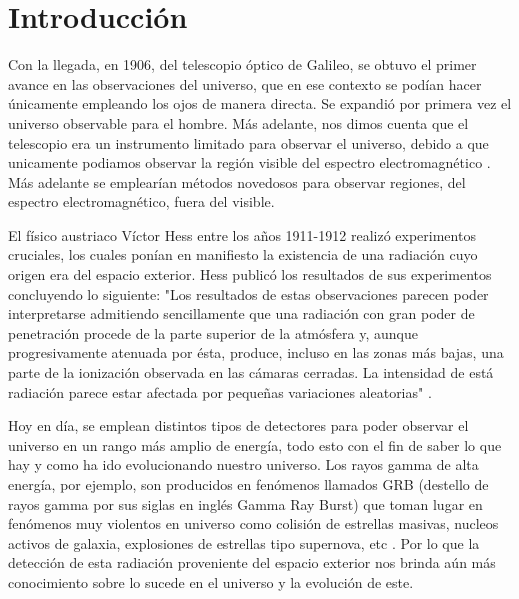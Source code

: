 \chapter{Introducción}
Con la llegada, en 1906, del telescopio óptico de Galileo, se obtuvo el primer avance en las observaciones del universo, que en ese contexto se podían hacer únicamente empleando los ojos de manera directa. Se expandió por primera vez el universo observable para el hombre. Más adelante, nos dimos cuenta que el telescopio era un instrumento limitado para observar el universo, debido a que unicamente podiamos observar la región visible del espectro electromagnético \cite{Vazquez}. Más adelante se emplearían métodos novedosos para observar regiones, del espectro electromagnético, fuera del visible.  

El físico austriaco Víctor Hess entre los años 1911-1912 realizó experimentos cruciales, los cuales ponían en manifiesto la existencia de una radiación cuyo origen era del espacio exterior. Hess publicó los resultados de sus experimentos concluyendo lo siguiente: "Los resultados de estas observaciones parecen poder interpretarse admitiendo sencillamente que una radiación con gran poder de penetración procede de la parte superior de la atmósfera y, aunque progresivamente atenuada por ésta, produce, incluso en las zonas más bajas, una parte de la ionización observada en las cámaras cerradas. La intensidad de está radiación parece estar afectada por pequeñas variaciones aleatorias" \cite{Lugo}.

Hoy en día, se emplean distintos tipos de detectores para poder observar el universo en un rango más amplio de energía, todo esto con el fin de saber lo que hay y como ha ido evolucionando nuestro universo. Los rayos gamma de alta energía, por ejemplo, son producidos en fenómenos llamados GRB (destello de rayos gamma por sus siglas en inglés Gamma Ray Burst) que toman lugar en fenómenos muy violentos en universo como colisión de estrellas masivas, nucleos activos de galaxia, explosiones de estrellas tipo supernova, etc \cite{PEREZY2009}. Por lo que la detección de esta radiación proveniente del espacio exterior nos brinda aún más conocimiento sobre lo sucede en el universo y la evolución de este.